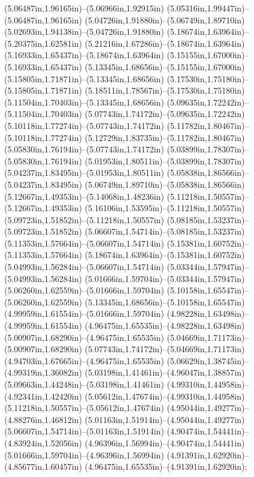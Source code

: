 (5.06487in,1.96165in)--(5.06966in,1.92915in) (5.05316in,1.99447in)--(5.06487in,1.96165in) (5.04726in,1.91880in)--(5.06749in,1.89710in) (5.02693in,1.94138in)--(5.04726in,1.91880in) (5.18674in,1.63964in)--(5.20375in,1.62581in) (5.21216in,1.67286in)--(5.18674in,1.63964in) (5.16933in,1.65437in)--(5.18674in,1.63964in) (5.15155in,1.67000in)--(5.16933in,1.65437in) (5.13345in,1.68656in)--(5.15155in,1.67000in) (5.15805in,1.71871in)--(5.13345in,1.68656in) (5.17530in,1.75180in)--(5.15805in,1.71871in) (5.18511in,1.78567in)--(5.17530in,1.75180in) (5.11504in,1.70403in)--(5.13345in,1.68656in) (5.09635in,1.72242in)--(5.11504in,1.70403in) (5.07743in,1.74172in)--(5.09635in,1.72242in) (5.10118in,1.77274in)--(5.07743in,1.74172in) (5.11782in,1.80467in)--(5.10118in,1.77274in) (5.12729in,1.83735in)--(5.11782in,1.80467in) (5.05830in,1.76194in)--(5.07743in,1.74172in) (5.03899in,1.78307in)--(5.05830in,1.76194in) (5.01953in,1.80511in)--(5.03899in,1.78307in) (5.04237in,1.83495in)--(5.01953in,1.80511in) (5.05838in,1.86566in)--(5.04237in,1.83495in) (5.06749in,1.89710in)--(5.05838in,1.86566in) (5.12667in,1.49353in)--(5.14068in,1.48236in) (5.11218in,1.50557in)--(5.12667in,1.49353in) (5.16106in,1.53595in)--(5.11218in,1.50557in) (5.09723in,1.51852in)--(5.11218in,1.50557in) (5.08185in,1.53237in)--(5.09723in,1.51852in) (5.06607in,1.54714in)--(5.08185in,1.53237in) (5.11353in,1.57664in)--(5.06607in,1.54714in) (5.15381in,1.60752in)--(5.11353in,1.57664in) (5.18674in,1.63964in)--(5.15381in,1.60752in) (5.04993in,1.56284in)--(5.06607in,1.54714in) (5.03344in,1.57947in)--(5.04993in,1.56284in) (5.01666in,1.59704in)--(5.03344in,1.57947in) (5.06260in,1.62559in)--(5.01666in,1.59704in) (5.10158in,1.65547in)--(5.06260in,1.62559in) (5.13345in,1.68656in)--(5.10158in,1.65547in) (4.99959in,1.61554in)--(5.01666in,1.59704in) (4.98228in,1.63498in)--(4.99959in,1.61554in) (4.96475in,1.65535in)--(4.98228in,1.63498in) (5.00907in,1.68290in)--(4.96475in,1.65535in) (5.04669in,1.71173in)--(5.00907in,1.68290in) (5.07743in,1.74172in)--(5.04669in,1.71173in) (4.94703in,1.67665in)--(4.96475in,1.65535in) (5.06629in,1.38745in)--(4.99319in,1.36082in) (5.03198in,1.41461in)--(4.96047in,1.38857in) (5.09663in,1.44248in)--(5.03198in,1.41461in) (4.99310in,1.44958in)--(4.92341in,1.42420in) (5.05612in,1.47674in)--(4.99310in,1.44958in) (5.11218in,1.50557in)--(5.05612in,1.47674in) (4.95044in,1.49277in)--(4.88276in,1.46812in) (5.01163in,1.51914in)--(4.95044in,1.49277in) (5.06607in,1.54714in)--(5.01163in,1.51914in) (4.90474in,1.54441in)--(4.83924in,1.52056in) (4.96396in,1.56994in)--(4.90474in,1.54441in) (5.01666in,1.59704in)--(4.96396in,1.56994in) (4.91391in,1.62920in)--(4.85677in,1.60457in) (4.96475in,1.65535in)--(4.91391in,1.62920in);
